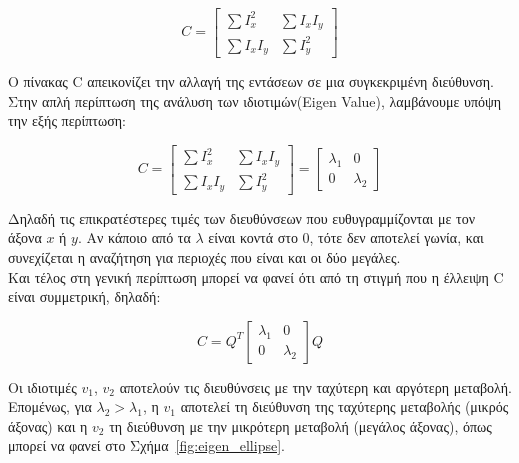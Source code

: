 \begin{equation} 
C =  \begin{bmatrix} \sum I_x^2 & \sum I_xI_y \\ \sum I_xI_y & \sum I_y^2 \end{bmatrix} %
\end{equation}

 
\vspace{0.5cm}
 
Ο πίνακας C απεικονίζει την αλλαγή της εντάσεων σε μια συγκεκριμένη διεύθυνση.\\
Στην απλή περίπτωση της ανάλυση των ιδιοτιμών(Eigen Value), λαμβάνουμε υπόψη την εξής περίπτωση:

\begin{equation} 
C =  \begin{bmatrix} \sum I_x^2 & \sum I_xI_y \\ \sum I_xI_y & \sum I_y^2 \end{bmatrix} = \begin{bmatrix} \lambda_1 & 0 \\ 0 & \lambda_2 \end{bmatrix}
\end{equation}

\vspace{0.5cm}

Δηλαδή τις επικρατέστερες τιμές των διευθύνσεων που ευθυγραμμίζονται με τον άξονα $x$ ή $y$. 
Αν κάποιο από τα $\lambda$ είναι κοντά στο 0, τότε δεν αποτελεί γωνία, και συνεχίζεται η αναζήτηση για περιοχές που είναι και οι δύο μεγάλες.\\
Και τέλος στη γενική περίπτωση μπορεί να φανεί ότι από τη στιγμή που η έλλειψη C είναι συμμετρική, δηλαδή:

\begin{equation} 
C = Q^T \begin{bmatrix} \lambda_1 & 0 \\ 0 & \lambda_2 \end{bmatrix}Q
\end{equation}

Οι ιδιοτιμές $v_1$, $v_2$ αποτελούν τις διευθύνσεις με την ταχύτερη και αργότερη μεταβολή. Επομένως, για 
$\lambda_2 > \lambda_1$, η $v_1$ αποτελεί τη διεύθυνση της ταχύτερης μεταβολής (μικρός άξονας) 
και η $v_2$ τη διεύθυνση με την μικρότερη μεταβολή (μεγάλος άξονας), όπως μπορεί να φανεί στο Σχήμα~\ref{fig:eigen_ellipse}.
 
